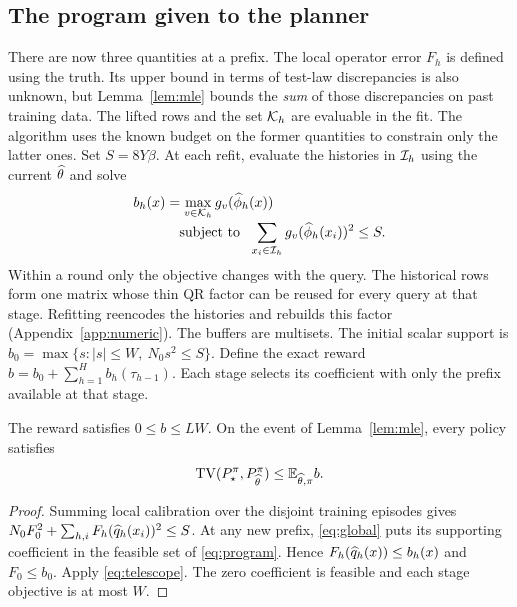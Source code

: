 \subsection{The program given to the planner}
There are now three quantities at a prefix. The local operator error $F_h$ is defined using the truth. Its upper bound in terms of test-law discrepancies is also unknown, but Lemma~\ref{lem:mle} bounds the \emph{sum} of those discrepancies on past training data. The lifted rows and the set $\mathcal K_h$ are evaluable in the fit. The algorithm uses the known budget on the former quantities to constrain only the latter ones.
Set $S=8Y\beta$. At each refit, evaluate the histories in $\mathcal I_h$ using the current $\widehat\theta$ and solve
\begin{align}
 b_h(x)&=\max_{v\in\mathcal K_h}g_v(\widehat\phi_h(x)) \nonumber\\[-2pt]
 &\quad\text{subject to }\
 \sum_{x_i\in\mathcal I_h}g_v(\widehat\phi_h(x_i))^2\le S .
 \label{eq:program}
\end{align}
Within a round only the objective changes with the query. The historical rows form one matrix whose thin QR factor can be reused for every query at that stage. Refitting reencodes the histories and rebuilds this factor (Appendix~\ref{app:numeric}). The buffers are multisets. The initial scalar support is $b_0=\max\{s:|s|\le W,\ N_0s^2\le S\}$. Define the exact reward $b=b_0+\sum_{h=1}^H b_h(\tau_{h-1})$. Each stage selects its coefficient with only the prefix available at that stage.

\begin{proposition}\label{prop:cert}
The reward satisfies $0\le b\le LW$. On the event of Lemma~\ref{lem:mle}, every policy satisfies
\begin{equation}
 \operatorname{TV}(P_\star^\pi,P_{\widehat\theta}^\pi)
       \le \mathbb E_{\widehat\theta,\pi} b .
 \label{eq:intro}
\end{equation}
\end{proposition}
\begin{proof}
Summing local calibration over the disjoint training episodes gives $N_0F_0^2+\sum_{h,i}F_h(\widehat q_h(x_i))^2\le S$. At any new prefix, \eqref{eq:global} puts its supporting coefficient in the feasible set of \eqref{eq:program}. Hence $F_h(\widehat q_h(x))\le b_h(x)$ and $F_0\le b_0$. Apply \eqref{eq:telescope}. The zero coefficient is feasible and each stage objective is at most $W$.
\end{proof}

